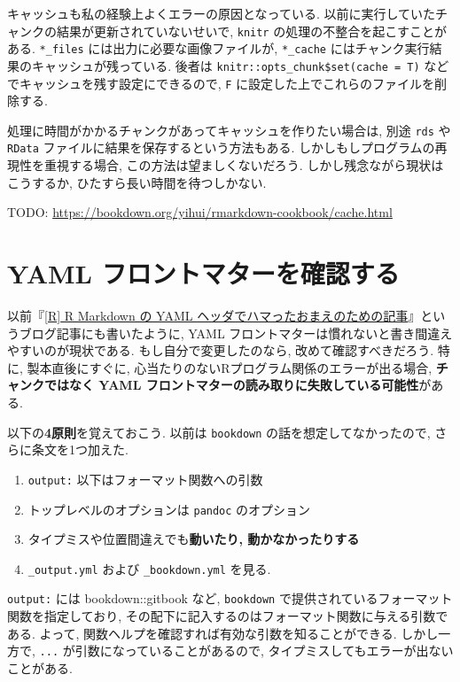 \documentclass[
  nomag]{bxjsbook}
\providecommand{\tightlist}{%
  \setlength{\itemsep}{0pt}\setlength{\parskip}{0pt}}
\theoremstyle{definition}
\theoremstyle{definition}
\theoremstyle{definition}
\theoremstyle{remark}
\begin{document}
キャッシュも私の経験上よくエラーの原因となっている.
以前に実行していたチャンクの結果が更新されていないせいで, \texttt{knitr}
の処理の不整合を起こすことがある. \texttt{*\_files}
には出力に必要な画像ファイルが, \texttt{*\_cache}
にはチャンク実行結果のキャッシュが残っている. 後者は
\texttt{knitr::opts\_chunk\$set(cache\ =\ T)}
などでキャッシュを残す設定にできるので, \texttt{F}
に設定した上でこれらのファイルを削除する.

処理に時間がかかるチャンクがあってキャッシュを作りたい場合は, 別途
\texttt{rds} や \texttt{RData} ファイルに結果を保存するという方法もある.
しかしもしプログラムの再現性を重視する場合,
この方法は望ましくないだろう. しかし残念ながら現状はこうするか,
ひたすら長い時間を待つしかない.

TODO: \url{https://bookdown.org/yihui/rmarkdown-cookbook/cache.html}

\hypertarget{yaml-ux30d5ux30edux30f3ux30c8ux30deux30bfux30fcux3092ux78baux8a8dux3059ux308b}{%
\section{YAML
フロントマターを確認する}\label{yaml-ux30d5ux30edux30f3ux30c8ux30deux30bfux30fcux3092ux78baux8a8dux3059ux308b}}

以前『\href{https://ill-identified.hatenablog.com/entry/2020/09/05/202403}{{[}R{]}
R Markdown の YAML
ヘッダでハマったおまえのための記事}』というブログ記事にも書いたように,
YAML フロントマターは慣れないと書き間違えやすいのが現状である.
もし自分で変更したのなら, 改めて確認すべきだろう. 特に,
製本直後にすぐに, 心当たりのないRプログラム関係のエラーが出る場合,
\textbf{チャンクではなく YAML
フロントマターの読み取りに失敗している可能性}がある.

以下の\textbf{4原則}を覚えておこう. 以前は \texttt{bookdown}
の話を想定してなかったので, さらに条文を1つ加えた.

\begin{enumerate}
\def\labelenumi{\arabic{enumi}.}
\tightlist
\item
  \texttt{output:} 以下はフォーマット関数への引数
\item
  トップレベルのオプションは \texttt{pandoc} のオプション
\item
  タイプミスや位置間違えでも\textbf{動いたり, 動かなかったりする}
\item
  \texttt{\_output.yml} および \texttt{\_bookdown.yml} を見る.
\end{enumerate}

\texttt{output:} には bookdown::gitbook など, \texttt{bookdown}
で提供されているフォーマット関数を指定しており,
その配下に記入するのはフォーマット関数に与える引数である. よって,
関数ヘルプを確認すれば有効な引数を知ることができる. しかし一方で,
\texttt{...} が引数になっていることがあるので,
タイプミスしてもエラーが出ないことがある.
\end{document}
